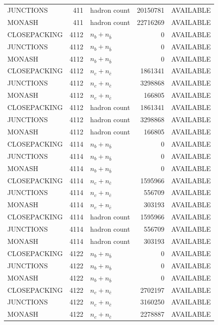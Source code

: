 \begin{landscape}
\begin{longtable}{@{}lrlrl@{}}
JUNCTIONS & 411 & hadron count & \num{20150781} & AVAILABLE \\
MONASH & 411 & hadron count & \num{22716269} & AVAILABLE \\
CLOSEPACKING & 4112 & $n_b+n_{\bar b}$ & \num{0} & AVAILABLE \\
JUNCTIONS & 4112 & $n_b+n_{\bar b}$ & \num{0} & AVAILABLE \\
MONASH & 4112 & $n_b+n_{\bar b}$ & \num{0} & AVAILABLE \\
CLOSEPACKING & 4112 & $n_c+n_{\bar c}$ & \num{1861341} & AVAILABLE \\
JUNCTIONS & 4112 & $n_c+n_{\bar c}$ & \num{3298868} & AVAILABLE \\
MONASH & 4112 & $n_c+n_{\bar c}$ & \num{166805} & AVAILABLE \\
CLOSEPACKING & 4112 & hadron count & \num{1861341} & AVAILABLE \\
JUNCTIONS & 4112 & hadron count & \num{3298868} & AVAILABLE \\
MONASH & 4112 & hadron count & \num{166805} & AVAILABLE \\
CLOSEPACKING & 4114 & $n_b+n_{\bar b}$ & \num{0} & AVAILABLE \\
JUNCTIONS & 4114 & $n_b+n_{\bar b}$ & \num{0} & AVAILABLE \\
MONASH & 4114 & $n_b+n_{\bar b}$ & \num{0} & AVAILABLE \\
CLOSEPACKING & 4114 & $n_c+n_{\bar c}$ & \num{1595966} & AVAILABLE \\
JUNCTIONS & 4114 & $n_c+n_{\bar c}$ & \num{556709} & AVAILABLE \\
MONASH & 4114 & $n_c+n_{\bar c}$ & \num{303193} & AVAILABLE \\
CLOSEPACKING & 4114 & hadron count & \num{1595966} & AVAILABLE \\
JUNCTIONS & 4114 & hadron count & \num{556709} & AVAILABLE \\
MONASH & 4114 & hadron count & \num{303193} & AVAILABLE \\
CLOSEPACKING & 4122 & $n_b+n_{\bar b}$ & \num{0} & AVAILABLE \\
JUNCTIONS & 4122 & $n_b+n_{\bar b}$ & \num{0} & AVAILABLE \\
MONASH & 4122 & $n_b+n_{\bar b}$ & \num{0} & AVAILABLE \\
CLOSEPACKING & 4122 & $n_c+n_{\bar c}$ & \num{2702197} & AVAILABLE \\
JUNCTIONS & 4122 & $n_c+n_{\bar c}$ & \num{3160250} & AVAILABLE \\
MONASH & 4122 & $n_c+n_{\bar c}$ & \num{2278887} & AVAILABLE \\

\end{longtable}
\end{landscape}
